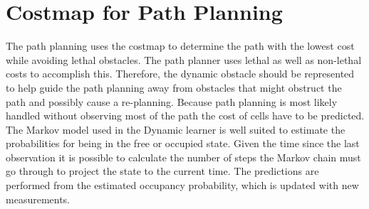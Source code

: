\section{Costmap for Path Planning}
\label{sec:cost_interpretation_path_planning}
The path planning uses the costmap to determine the path with the lowest cost while avoiding lethal obstacles. 
The path planner uses lethal as well as non-lethal costs to accomplish this. 
Therefore, the dynamic obstacle should be represented to help guide the path planning away from obstacles that might obstruct the path and possibly cause a re-planning. 
Because path planning is most likely handled without observing most of the path the cost of cells have to be predicted. 
The Markov model used in the Dynamic learner is well suited to estimate the probabilities for being in the free or occupied state. 
Given the time since the last observation it is possible to calculate the number of steps the Markov chain must go through to project the state to the current time.
The predictions are performed from the estimated occupancy probability, which is updated with new measurements.

